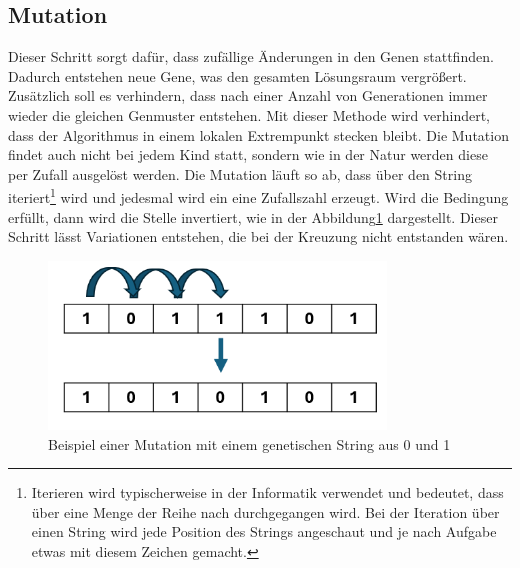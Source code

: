 %
%
%
%
\subsection{Mutation
\label{buch:paper:varalg:subsection:mutation}}
Dieser Schritt sorgt dafür, dass zufällige Änderungen in 
den Genen stattfinden. Dadurch entstehen neue Gene, was den 
gesamten Lösungsraum vergrößert. Zusätzlich soll es verhindern,
dass nach einer Anzahl von Generationen immer wieder die
gleichen Genmuster entstehen. Mit dieser Methode wird
verhindert, dass der Algorithmus in einem lokalen Extrempunkt
stecken bleibt. Die Mutation findet auch nicht bei jedem Kind
statt, sondern wie in der Natur werden diese per Zufall
ausgelöst werden. Die Mutation läuft so ab, dass über den String
iteriert\footnote{
    Iterieren wird typischerweise in der Informatik verwendet und 
	bedeutet, dass über eine Menge der Reihe nach durchgegangen wird. 
	Bei der Iteration über einen String wird jede Position des Strings 
	angeschaut und je nach Aufgabe etwas mit diesem Zeichen gemacht.
    } 
wird und jedesmal wird ein eine Zufallszahl erzeugt. Wird 
die Bedingung erfüllt, dann wird die Stelle invertiert, wie in der
Abbildung\ref{fig:mutation_genetic_string} dargestellt. Dieser Schritt 
lässt Variationen entstehen, die bei der Kreuzung nicht entstanden wären.  
\begin{figure}
	\centering
	\includegraphics[width=0.8\textwidth]{
        papers/varalg/images/teil3/09GeneticStringMutation.png
        }
	\caption{Beispiel einer Mutation mit einem genetischen String aus 0 und 1}
	\label{fig:mutation_genetic_string}
\end{figure}

